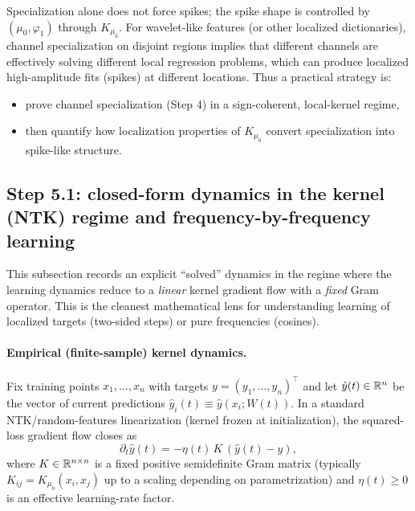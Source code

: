 Specialization alone does not force spikes; the spike shape is controlled by $(\mu_0,\varphi_1)$ through $K_{\mu_0}$.
For wavelet-like features (or other localized dictionaries), channel specialization on disjoint regions implies that different channels are effectively solving different local regression problems, which can produce localized high-amplitude fits (spikes) at different locations.
Thus a practical strategy is:
\begin{itemize}
\item prove channel specialization (Step 4) in a sign-coherent, local-kernel regime,
\item then quantify how localization properties of $K_{\mu_0}$ convert specialization into spike-like structure.
\end{itemize}

\subsection{Step 5.1: closed-form dynamics in the kernel (NTK) regime and frequency-by-frequency learning}
\label{subsec:step51}

This subsection records an explicit ``solved'' dynamics in the regime where the learning dynamics reduce to a \emph{linear} kernel gradient flow with a \emph{fixed} Gram operator.
This is the cleanest mathematical lens for understanding learning of localized targets (two-sided steps) or pure frequencies (cosines).

\paragraph{Empirical (finite-sample) kernel dynamics.}
Fix training points $x_1,\dots,x_n$ with targets $y=(y_1,\dots,y_n)^\top$ and let $\hat y(t)\in\mathbb{R}^n$ be the vector of current predictions $\hat y_i(t)\equiv \hat y(x_i;W(t))$.
In a standard NTK/random-features linearization (kernel frozen at initialization), the squared-loss gradient flow closes as
\begin{equation}\label{eq:kernel-flow}
\partial_t \hat y(t)=-\eta(t)\,K\,(\hat y(t)-y),
\end{equation}
where $K\in\mathbb{R}^{n\times n}$ is a fixed positive semidefinite Gram matrix (typically $K_{ij}=K_{\mu_0}(x_i,x_j)$ up to a scaling depending on parametrization) and $\eta(t)\ge 0$ is an effective learning-rate factor.

